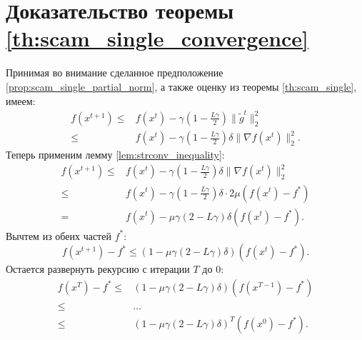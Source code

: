 \section{Доказательство теоремы \ref{th:scam_single_convergence}} \label{app:scam_single_convergence_proof}
    Принимая во внимание сделанное предположение \ref{prop:scam_single_partial_norm}, а также оценку из теоремы \ref{th:scam_single}, имеем:
    \begin{align*}
        f(x^{t + 1}) \leq& f(x^t) - \gamma \left(1 - \frac{L \gamma}{2}\right) \|\tilde{g}^t\|_2^2 \\
        \leq& f(x^t) - \gamma \left(1 - \frac{L \gamma}{2}\right) \delta \|\nabla f(x^t)\|_2^2.
    \end{align*}
    Теперь применим лемму \ref{lem:strconv_inequality}:
    \begin{align*}
        f(x^{t + 1}) \leq& f(x^t) - \gamma \left(1 - \frac{L \gamma}{2}\right) \delta \|\nabla f(x^t)\|_2^2 \\
        \leq& f(x^t) - \gamma \left(1 - \frac{L \gamma}{2}\right) \delta \cdot 2\mu (f(x^t) - f^*) \\
        =& f(x^t) - \mu\gamma (2 - L \gamma) \delta (f(x^t) - f^*).
    \end{align*}
    Вычтем из обеих частей $f^*$:
    \begin{equation*}
        f(x^{t + 1}) - f^* \leq (1 - \mu\gamma (2 - L \gamma) \delta) (f(x^t) - f^*).
    \end{equation*}
    Остается развернуть рекурсию с итерации $T$ до 0:
    \begin{align*}
        f(x^T) - f^* \leq& (1 - \mu\gamma (2 - L \gamma) \delta) (f(x^{T - 1}) - f^*) \\
        \leq& \ldots \\
        \leq& (1 - \mu\gamma (2 - L \gamma) \delta)^T (f(x^0) - f^*).
    \end{align*}
